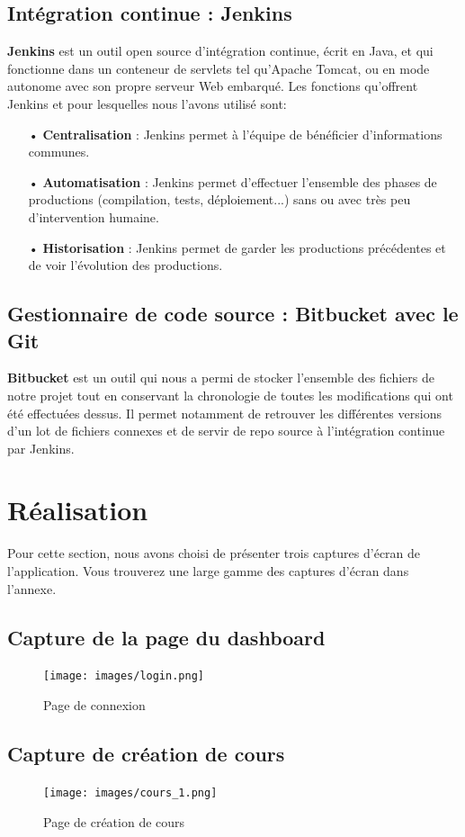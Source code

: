 \documentclass[12pt]{report}
\begin{document}
	  \subsection{Intégration continue : Jenkins}
	    \textbf{Jenkins} est un outil open source d'intégration continue, écrit en Java, et qui fonctionne dans un conteneur de servlets tel qu’Apache Tomcat, ou en mode autonome avec son propre serveur Web embarqué. Les fonctions qu'offrent Jenkins et pour lesquelles nous l'avons utilisé sont:
		\begin{itemize}
		  \item[•] \textbf{Centralisation} : Jenkins permet à l'équipe de bénéficier d'informations communes.
		  \item[•] \textbf{Automatisation} : Jenkins permet d'effectuer l'ensemble des phases de productions (compilation, tests, 	déploiement...) sans ou avec très peu d'intervention humaine.
		  \item[•] \textbf{Historisation} : Jenkins permet de garder les productions précédentes et de voir l'évolution des productions.
		\end{itemize}
	    
	  \subsection{Gestionnaire de code source : Bitbucket avec le Git}
	  \textbf{Bitbucket} est un outil qui nous a permi de stocker l'ensemble des fichiers de notre projet tout en conservant la chronologie de toutes les modifications qui ont été effectuées dessus. Il permet notamment de retrouver les différentes versions d'un lot de fichiers connexes et de servir de repo source à l'intégration continue par Jenkins.
	  
      \section{Réalisation}
	Pour cette section, nous avons choisi de présenter trois captures d'écran de l'application. Vous trouverez une large gamme des captures d'écran dans l'annexe.
	\subsection{Capture de la page du dashboard}
	\begin{figure}[H]
	\begin{center}
	\texttt{[image: images/login.png]}
	\caption{Page de connexion}
	\end{center}
	\end{figure}
\subsection{Capture de création de cours }
\begin{figure}[H]
\begin{center}
\texttt{[image: images/cours\_1.png]}
\caption{Page de création de cours}
\end{center}
\end{figure}
\lhead[]{} \rhead[]{} \chead[]{}


\newpage

%

\appendix

\end{document}
